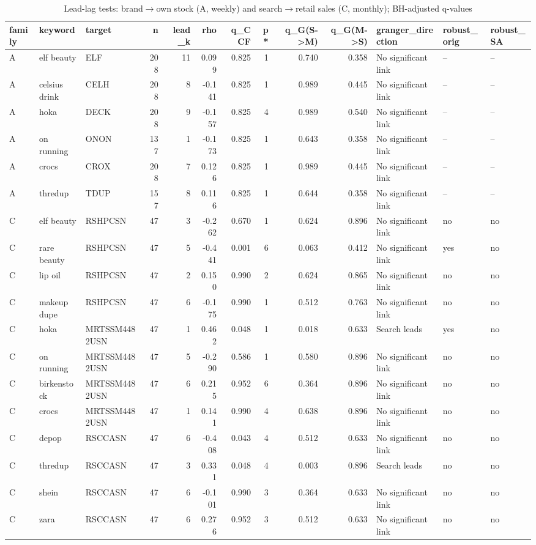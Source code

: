 \begin{table}[t]
\scriptsize
\centering
\caption{Lead-lag tests: brand$\rightarrow$own stock (A, weekly) and search$\rightarrow$retail sales (C, monthly); BH-adjusted q-values}
\label{tab:lead_lag}
\begin{tabular}{lllrrrrrrrlll}
\toprule
family & keyword & target & n & lead\_k & rho & q\_CCF & p* & q\_G(S->M) & q\_G(M->S) & granger\_direction & robust\_orig & robust\_SA \\
\midrule
A & elf beauty & ELF & 208 & 11 & 0.099 & 0.825 & 1 & 0.740 & 0.358 & No significant link & -- & -- \\
A & celsius drink & CELH & 208 & 8 & -0.141 & 0.825 & 1 & 0.989 & 0.445 & No significant link & -- & -- \\
A & hoka & DECK & 208 & 9 & -0.157 & 0.825 & 4 & 0.989 & 0.540 & No significant link & -- & -- \\
A & on running & ONON & 137 & 1 & -0.173 & 0.825 & 1 & 0.643 & 0.358 & No significant link & -- & -- \\
A & crocs & CROX & 208 & 7 & 0.126 & 0.825 & 1 & 0.989 & 0.445 & No significant link & -- & -- \\
A & thredup & TDUP & 157 & 8 & 0.116 & 0.825 & 1 & 0.644 & 0.358 & No significant link & -- & -- \\
C & elf beauty & RSHPCSN & 47 & 3 & -0.262 & 0.670 & 1 & 0.624 & 0.896 & No significant link & no & no \\
C & rare beauty & RSHPCSN & 47 & 5 & -0.441 & 0.001 & 6 & 0.063 & 0.412 & No significant link & yes & no \\
C & lip oil & RSHPCSN & 47 & 2 & 0.150 & 0.990 & 2 & 0.624 & 0.865 & No significant link & no & no \\
C & makeup dupe & RSHPCSN & 47 & 6 & -0.175 & 0.990 & 1 & 0.512 & 0.763 & No significant link & no & no \\
C & hoka & MRTSSM4482USN & 47 & 1 & 0.462 & 0.048 & 1 & 0.018 & 0.633 & Search leads & yes & no \\
C & on running & MRTSSM4482USN & 47 & 5 & -0.290 & 0.586 & 1 & 0.580 & 0.896 & No significant link & no & no \\
C & birkenstock & MRTSSM4482USN & 47 & 6 & 0.215 & 0.952 & 6 & 0.364 & 0.896 & No significant link & no & no \\
C & crocs & MRTSSM4482USN & 47 & 1 & 0.141 & 0.990 & 4 & 0.638 & 0.896 & No significant link & no & no \\
C & depop & RSCCASN & 47 & 6 & -0.408 & 0.043 & 4 & 0.512 & 0.633 & No significant link & no & no \\
C & thredup & RSCCASN & 47 & 3 & 0.331 & 0.048 & 4 & 0.003 & 0.896 & Search leads & no & no \\
C & shein & RSCCASN & 47 & 6 & -0.101 & 0.990 & 3 & 0.364 & 0.633 & No significant link & no & no \\
C & zara & RSCCASN & 47 & 6 & 0.276 & 0.952 & 3 & 0.512 & 0.633 & No significant link & no & no \\
\bottomrule
\end{tabular}
\end{table}
